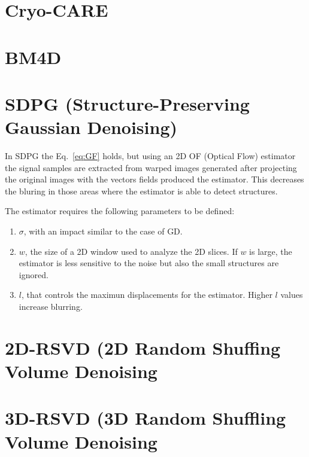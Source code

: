 \documentclass{article}
\begin{document}
\section{Cryo-CARE \cite{buchholz2019cryo}}

\section{BM4D}

\section{SDPG (Structure-Preserving Gaussian Denoising) \cite{gonzalez2023structure}}

In SDPG the Eq.~\ref{eq:GF} holds, but using an 2D OF (Optical Flow) estimator
the signal samples are extracted from warped images generated
after projecting the original images with the vectors fields produced
the estimator. This decreases the bluring in those areas where the
estimator is able to detect structures.

The estimator requires the following parameters to be defined:
\begin{enumerate}
\item $\sigma$, with an impact similar to the case of GD.
\item $w$, the size of a 2D window used to analyze the 2D slices. If
  $w$ is large, the estimator is less sensitive to the noise but also
  the small structures are ignored.
\item $l$, that controls the maximun displacements for the
  estimator. Higher $l$ values increase blurring.
\end{enumerate}

\section{2D-RSVD (2D Random Shuffing Volume Denoising}

\section{3D-RSVD (3D Random Shuffling Volume Denoising}


\section{}



\end{document}
